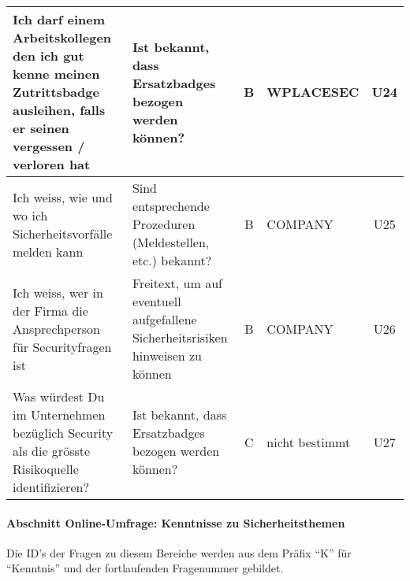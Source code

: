 \documentclass[../../main.tex]{subfiles}
\begin{document}
\begin{table}[H]
\begin{tabular}{ |p{5.5cm}|p{5.5cm}|c|p{2.5cm}|c|}
Ich darf einem Arbeitskollegen den ich gut kenne meinen Zutrittsbadge ausleihen, falls er seinen vergessen / verloren hat & Ist bekannt, dass Ersatzbadges bezogen werden können? & B & WPLACESEC & U24 \\
\hline

Ich weiss, wie und wo ich Sicherheitsvorfälle melden kann & Sind entsprechende Prozeduren (Meldestellen, etc.) bekannt? & B & COMPANY & U25 \\
\hline

Ich weiss, wer in der Firma die Ansprechperson für Securityfragen ist & Freitext, um auf eventuell aufgefallene Sicherheitsrisiken hinweisen zu können & B & COMPANY & U26 \\
\hline

Was würdest Du im Unternehmen bezüglich Security als die grösste Risikoquelle identifizieren? & Ist bekannt, dass Ersatzbadges bezogen werden können? & C & nicht bestimmt & U27 \\
\hline

\end{tabular}
\end{table}



\paragraph*{Abschnitt Online-Umfrage: Kenntnisse zu Sicherheitsthemen}\mbox{}

\begin{sloppypar}
Die ID's der Fragen zu diesem Bereiche werden aus dem Präfix "`K"' für "`Kenntnis"' und der fortlaufenden Fragenummer gebildet.
\end{sloppypar}


\sloppy 
\end{document}
